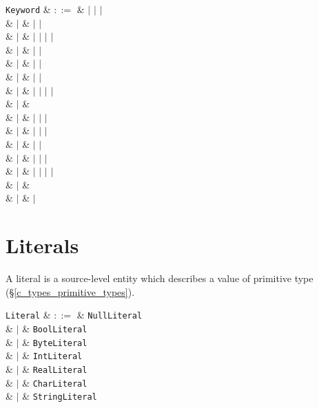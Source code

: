\begin{syntax}
\verb+Keyword+ & $::=$ &  $|$  $|$  $|$ \\
         & $|$ &  $|$  $|$ \\
         & $|$ &  $|$  $|$  $|$  $|$ \\
         & $|$ &  $|$  $|$ \\
         & $|$ &  $|$  $|$ \\
         & $|$ &  $|$  $|$ \\
         & $|$ &  $|$  $|$  $|$  $|$ \\
         & $|$ &  \\
         & $|$ &  $|$  $|$  $|$ \\
         & $|$ &  $|$  $|$  $|$ \\
         & $|$ &  $|$  $|$ \\
         & $|$ &  $|$  $|$  $|$ \\
         & $|$ &  $|$  $|$  $|$  $|$  \\
         & $|$ &  \\
         & $|$ &  $|$ \\
\end{syntax}

\section{Literals}

A \gls{literal} is a source-level entity which describes a value of primitive type (\S\ref{c_types_primitive_types}).

\begin{syntax}
\verb+Literal+ & $::=$ &  \verb+NullLiteral+ \\
  & $|$ & \verb+BoolLiteral+ \\
  & $|$ & \verb+ByteLiteral+ \\
  & $|$ & \verb+IntLiteral+ \\
  & $|$ & \verb+RealLiteral+ \\
  & $|$ & \verb+CharLiteral+ \\
  & $|$ & \verb+StringLiteral+ \\
\\
\end{syntax}

